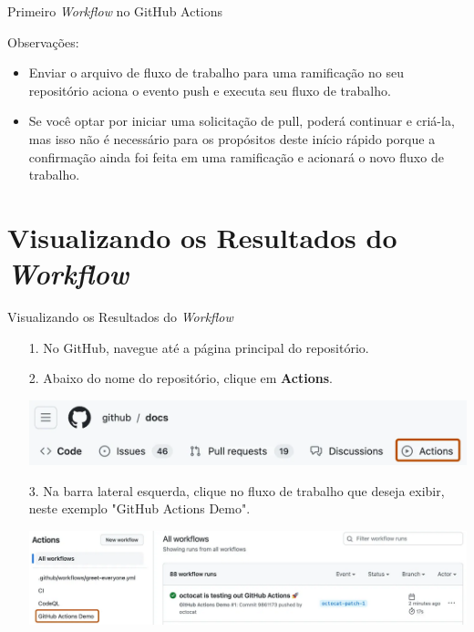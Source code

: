 \documentclass[t,serif]{beamer}
\begin{document}
	\begin{frame}{Primeiro \textit{Workflow} no GitHub Actions}
		\vspace{1cm}
		\begin{block}{Observações:}
			\begin{itemize}
				\item Enviar o arquivo de fluxo de trabalho para uma ramificação no seu repositório aciona o evento push e executa seu fluxo de trabalho.
				\item Se você optar por iniciar uma solicitação de pull, poderá continuar e criá-la, mas isso não é necessário para os propósitos deste início rápido porque a confirmação ainda foi feita em uma ramificação e acionará o novo fluxo de trabalho.
			\end{itemize}
		\end{block}
	\end{frame}
	
\section{Visualizando os Resultados do \textit{Workflow}}
	\begin{frame}{Visualizando os Resultados do \textit{Workflow}}
		\begin{enumerate}
			\item[1.] No GitHub, navegue até a página principal do repositório.
			\item[2.] Abaixo do nome do repositório, clique em \textbf{Actions}.
			\begin{center}
				\includegraphics[width=\linewidth]{figs/3_6.png}
			\end{center}
			\item[3.] Na barra lateral esquerda, clique no fluxo de trabalho que deseja exibir, neste exemplo "GitHub Actions Demo".
			\begin{center}
				\includegraphics[width=\linewidth]{figs/3_7.png}
			\end{center}
		\end{enumerate}
	\end{frame}
	
\end{document}
